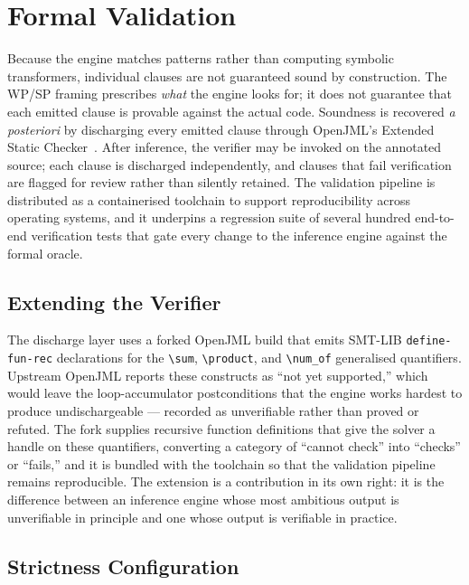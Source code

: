 \section{Formal Validation}
\label{sec:inf-validation}

Because the engine matches patterns rather than computing symbolic
transformers, individual clauses are not guaranteed sound by construction. The
WP/SP framing prescribes \emph{what} the engine looks for; it does not
guarantee that each emitted clause is provable against the actual code.
Soundness is recovered \emph{a posteriori} by discharging every emitted clause
through OpenJML's Extended Static Checker~\cite{openjml}. After inference, the
verifier may be invoked on the annotated source; each clause is discharged
independently, and clauses that fail verification are flagged for review rather
than silently retained. The validation pipeline is distributed as a
containerised toolchain to support reproducibility across operating systems,
and it underpins a regression suite of several hundred end-to-end verification
tests that gate every change to the inference engine against the formal oracle.

\subsection{Extending the Verifier}

The discharge layer uses a forked OpenJML build that emits SMT-LIB
\texttt{define-fun-rec} declarations for the \texttt{\textbackslash sum},
\texttt{\textbackslash product}, and \texttt{\textbackslash num\_of}
generalised quantifiers. Upstream OpenJML reports these constructs as ``not yet
supported,'' which would leave the loop-accumulator postconditions that the
engine works hardest to produce undischargeable --- recorded as unverifiable
rather than proved or refuted. The fork supplies recursive function definitions
that give the solver a handle on these quantifiers, converting a category of
``cannot check'' into ``checks'' or ``fails,'' and it is bundled with the
toolchain so that the validation pipeline remains reproducible. The extension
is a contribution in its own right: it is the difference between an inference
engine whose most ambitious output is unverifiable in principle and one whose
output is verifiable in practice.

\subsection{Strictness Configuration}

